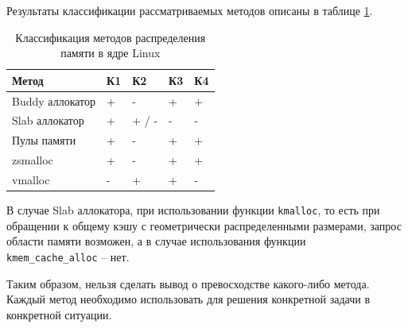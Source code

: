 Результаты классификации рассматриваемых методов описаны в таблице \ref{tbl:comparsion}.

\begin{table}[h]
	\small
	\caption{Классификация методов распределения памяти в ядре Linux}
	\label{tbl:comparsion}
	\begin{center}
	\begin{tabular}{|l|l|l|l|l|}
		\hline
		Метод & К1 & К2 & К3 & К4 \\ \hline
		Buddy аллокатор  & + & - & + & +\\ \hline
		Slab аллокатор & + & + / - & - & -\\ \hline
		Пулы памяти & + & - & + & + \\ \hline
		zsmalloc & + & - & + & + \\ \hline
		vmalloc & - & + & + & - \\ \hline
	\end{tabular}
\end{center}
\end{table}

В случае Slab аллокатора, при использовании функции \texttt{kmalloc}, то есть при обращении к общему кэшу с геометрически распределенными размерами, запрос области памяти возможен, а в случае использования функции \\ \texttt{kmem\_cache\_alloc} -- нет.

Таким образом, нельзя сделать вывод о превосходстве какого-либо метода. Каждый метод необходимо использовать для решения конкретной задачи в конкретной ситуации.

\pagebreak
